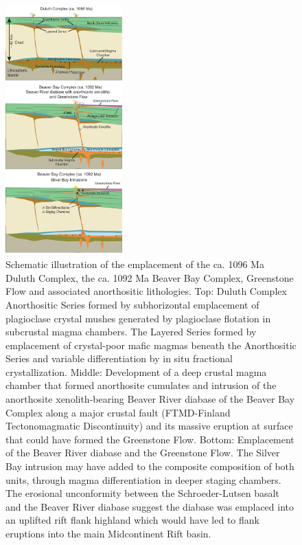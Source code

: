 \begin{figure}[h!]
\centering
\noindent\includegraphics[width=0.4\textwidth]{figure/Zhang2021/Flank_eruption.pdf}
\caption[Schematic illustration of the emplacement of the ca. 1096 Ma Duluth Complex, the ca. 1092 Ma Beaver Bay Complex, Greenstone Flow and associated anorthositic lithologies]{\footnotesize{Schematic illustration of the emplacement of the ca. 1096 Ma Duluth Complex, the ca. 1092 Ma Beaver Bay Complex, Greenstone Flow and associated anorthositic lithologies. Top: Duluth Complex Anorthositic Series formed by subhorizontal emplacement of plagioclase crystal mushes generated by plagioclase flotation in subcrustal magma chambers. The Layered Series formed by emplacement of crystal-poor mafic magmas beneath the Anorthositic Series and variable differentiation by in situ fractional crystallization. Middle: Development of a deep crustal magma chamber that formed anorthosite cumulates and intrusion of the anorthosite xenolith-bearing Beaver River diabase of the Beaver Bay Complex along a major crustal fault (FTMD-Finland Tectonomagmatic Discontinuity) and its massive eruption at surface that could have formed the Greenstone Flow. Bottom: Emplacement of the Beaver River diabase and the Greenstone Flow. The Silver Bay intrusion may have added to the composite composition of both units, through magma differentiation in deeper staging chambers. The erosional unconformity between the Schroeder-Lutsen basalt and the Beaver River diabase suggest the diabase was emplaced into an uplifted rift flank highland which would have led to flank eruptions into the main Midcontinent Rift basin.}}
\label{fig:Flank_eruption}
\end{figure}

